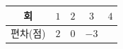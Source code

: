 {\renewcommand{\arraystretch}{1.35}\small
\begin{tabular}{|c|c|c|c|c|}
\hline
회 & $1$ & $2$ & $3$ & $4$ \\ \hline
편차(점) & $2$ & $0$ & $-3$ & \\ \hline
\end{tabular}}
